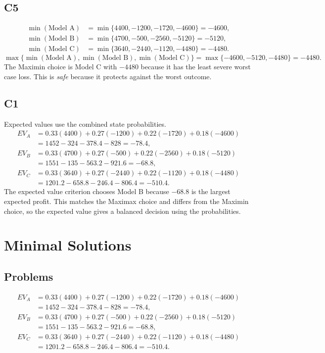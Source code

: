 \begin{ExamProblems}
		\subsection*{C5}
		\[
		\begin{aligned}
		\min(\text{Model A}) &= \min\{4400,-1200,-1720,-4600\} = -4600,\\
		\min(\text{Model B}) &= \min\{4700,-500,-2560,-5120\} = -5120,\\
		\min(\text{Model C}) &= \min\{3640,-2440,-1120,-4480\} = -4480.
		\end{aligned}
		\]
		\[
		\max\{\min(\text{Model A}), \min(\text{Model B}), \min(\text{Model C})\}
		= \max\{-4600, -5120, -4480\}
		= -4480.
		\]
		The Maximin choice is Model C with $-4480$ because it has the least severe worst case loss. This is \emph{safe} because it protects against the worst outcome.

		\subsection*{C1}
		Expected values use the combined state probabilities.
		\[
		\begin{aligned}
		EV_A &= 0.33(4400)+0.27(-1200)+0.22(-1720)+0.18(-4600)\\
		&= 1452-324-378.4-828=-78.4,\\
		EV_B &= 0.33(4700)+0.27(-500)+0.22(-2560)+0.18(-5120)\\
		&= 1551-135-563.2-921.6=-68.8,\\
		EV_C &= 0.33(3640)+0.27(-2440)+0.22(-1120)+0.18(-4480)\\
		&= 1201.2-658.8-246.4-806.4=-510.4.
		\end{aligned}
		\]
		The expected value criterion chooses Model B because $-68.8$ is the largest expected profit. This matches the Maximax choice and differs from the Maximin choice, so the expected value gives a balanced decision using the probabilities.
	\end{ExamProblems}


\section{Minimal Solutions}

\subsection*{Problems}
\[\begin{aligned}
		EV_A &= 0.33(4400)+0.27(-1200)+0.22(-1720)+0.18(-4600)\\
		&= 1452-324-378.4-828=-78.4,\\
		EV_B &= 0.33(4700)+0.27(-500)+0.22(-2560)+0.18(-5120)\\
		&= 1551-135-563.2-921.6=-68.8,\\
		EV_C &= 0.33(3640)+0.27(-2440)+0.22(-1120)+0.18(-4480)\\
		&= 1201.2-658.8-246.4-806.4=-510.4.
		\end{aligned}\]


